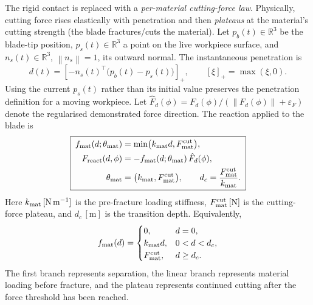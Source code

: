 \documentclass[11pt,a4paper]{article}
\newcommand{\R}{\mathbb{R}}
\newcommand{\norm}[1]{\left\lVert#1\right\rVert}
\newcommand{\unit}[1]{\,[\mathrm{#1}]}
\begin{document}
The rigid contact is replaced with a \emph{per-material cutting-force law}.
Physically, cutting force rises elastically with penetration and then
\emph{plateaus} at the material's cutting strength (the blade fractures/cuts the
material). Let $p_b(t)\in\R^3$ be the blade-tip position,
$p_s(t)\in\R^3$ a point on the live workpiece surface, and
$n_s(t)\in\R^3$, $\norm{n_s}=1$, its outward normal. The instantaneous
penetration is
\begin{equation}
d(t)=\left[-n_s(t)^\top\big(p_b(t)-p_s(t)\big)\right]_+,
\qquad [\xi]_+=\max(\xi,0).
\label{eq:penetration}
\end{equation}
Using the current $p_s(t)$ rather than its initial value preserves the
penetration definition for a moving workpiece. Let
$\hat F_d(\phi)=F_d(\phi)/(\norm{F_d(\phi)}+\varepsilon_F)$ denote the
regularised demonstrated force direction. The reaction applied to the blade is
\begin{equation}
\boxed{\;
\begin{aligned}
f_{\rm mat}(d;\theta_{\rm mat})
 &=\min\!\big(k_{\rm mat}d,F_{\rm mat}^{\rm cut}\big),\\
F_{\rm react}(d,\phi)
 &=-f_{\rm mat}(d;\theta_{\rm mat})\,\hat F_d(\phi),\\
\theta_{\rm mat}
 &=\big(k_{\rm mat},F_{\rm mat}^{\rm cut}\big),\qquad
d_c=\frac{F_{\rm mat}^{\rm cut}}{k_{\rm mat}} .
\end{aligned}\;}
\label{eq:cut}
\end{equation}
Here $k_{\rm mat}\unit{N\,m^{-1}}$ is the pre-fracture loading stiffness,
$F_{\rm mat}^{\rm cut}\unit{N}$ is the cutting-force plateau, and
$d_c\unit{m}$ is the transition depth. Equivalently,
\begin{equation}
f_{\rm mat}(d)=
\begin{cases}
0, & d=0,\\
k_{\rm mat}d, & 0<d<d_c,\\
F_{\rm mat}^{\rm cut}, & d\ge d_c.
\end{cases}
\label{eq:cut_piecewise}
\end{equation}
The first branch represents separation, the linear branch represents material
loading before fracture, and the plateau represents continued cutting after the
force threshold has been reached.
\end{document}
